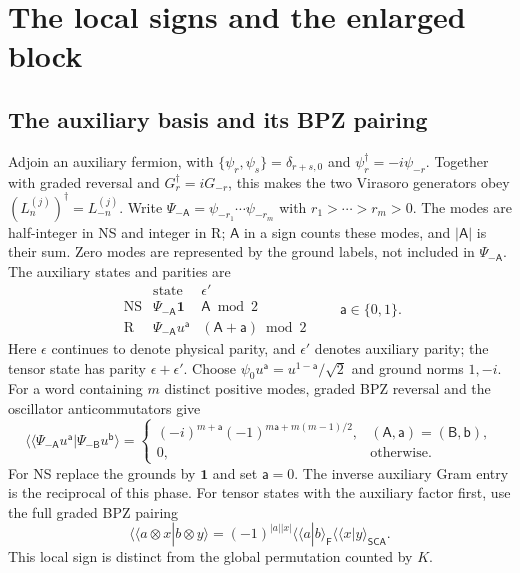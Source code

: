 \documentclass[11pt]{article}
\newcommand{\NS}{\mathrm{NS}}
\newcommand{\R}{\mathrm R}
\newcommand{\F}{\mathsf F}
\numberwithin{equation}{section}
\begin{document}
\section{The local signs and the enlarged block}
\label{sec:local-signs}

\subsection{The auxiliary basis and its BPZ pairing}

Adjoin an auxiliary fermion, with
$\{\psi_r,\psi_s\}=\delta_{r+s,0}$ and
$\psi_r^\dagger=-i\psi_{-r}$. Together with graded reversal and
$G_r^\dagger=iG_{-r}$, this makes the two Virasoro generators obey
$(L_n^{(j)})^\dagger=L_{-n}^{(j)}$. Write
$\Psi_{-\mathsf A}=\psi_{-r_1}\cdots\psi_{-r_m}$ with
$r_1>\cdots>r_m>0$. The modes are half-integer in NS and integer in R;
$\mathsf A$ in a sign counts these modes, and $|\mathsf A|$ is their
sum. Zero modes are represented by the ground labels, not included in
$\Psi_{-\mathsf A}$. The auxiliary states and parities are
\begin{equation}
 \begin{array}{c|c|c}
 &\text{state}&\epsilon'\\ \hline
 \NS&\Psi_{-\mathsf A}\mathbf1&\mathsf A\bmod2\\
 \R&\Psi_{-\mathsf A}u^{\mathsf a}&(\mathsf A+\mathsf a)\bmod2
 \end{array}
 \qquad \mathsf a\in\{0,1\}.
 \label{eq:aux-states}
\end{equation}
Here $\epsilon$ continues to denote physical parity, and $\epsilon'$
denotes auxiliary parity; the tensor state has parity $\epsilon+\epsilon'$.
Choose $\psi_0u^{\mathsf a}=u^{1-\mathsf a}/\sqrt2$ and ground norms
$1,-i$. For a word containing $m$ distinct positive modes, graded
BPZ reversal and the oscillator anticommutators give
\begin{equation}
 \langle\!\langle\Psi_{-\mathsf A}u^{\mathsf a}|
                         \Psi_{-\mathsf B}u^{\mathsf b}\rangle
 =\begin{cases}(-i)^{m+\mathsf a}
                   (-1)^{m\mathsf a+m(m-1)/2},
                    &(\mathsf A,\mathsf a)=(\mathsf B,\mathsf b),\\
                0,&\text{otherwise}.
   \end{cases}
 \label{eq:aux-metric}
\end{equation}
For NS replace the grounds by $\mathbf1$ and set $\mathsf a=0$.
The inverse auxiliary Gram entry is the reciprocal of this phase.
For tensor states with the auxiliary factor first, use the full graded
BPZ pairing
\begin{equation}
 \langle\!\langle a\otimes x|b\otimes y\rangle
 =(-1)^{|a||x|}
   \langle\!\langle a|b\rangle_{\F}
   \langle\!\langle x|y\rangle_{\mathsf{SCA}}.
 \label{eq:tensor-metric}
\end{equation}
This local sign is distinct from the global permutation counted by $K$.
\end{document}
